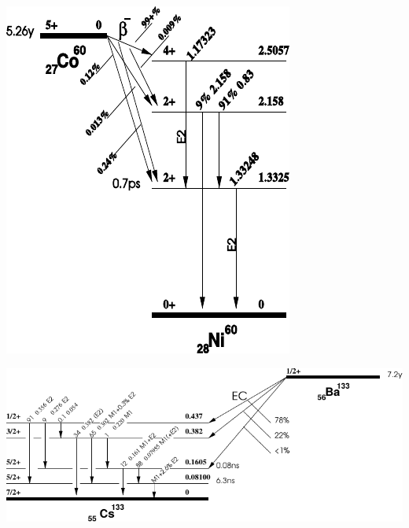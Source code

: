 \begin{multicols}{2}
\begin{center}
\begin{adjustbox}{max width=\linewidth, keepaspectratio}
        \end{adjustbox}
        \label{fig:54MnDecayScheme}
    \end{center}
\endminipage
%
\vspace{10mm}
%
\minipage{\linewidth}
    \begin{center}
        \captionsetup{type=figure}
        \begin{adjustbox}{max width=\linewidth, keepaspectratio}
            \includegraphics[]{pdf/60Co}
        \end{adjustbox}
        \label{fig:60CoDecayScheme}
    \end{center}
\endminipage
%
\vspace{10mm}
%
\minipage{\linewidth}
    \begin{center}
        \captionsetup{type=figure}
        \begin{adjustbox}{max width=\linewidth, keepaspectratio}
            \includegraphics[]{pdf/133Ba}

\end{adjustbox}
\end{center}
\end{multicols}
